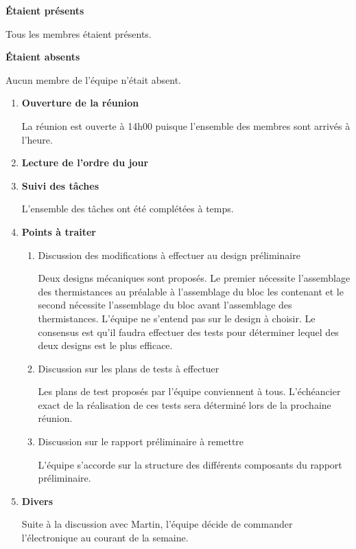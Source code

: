 \documentclass[12pt]{ULojpv}
\begin{document}
\entete

\textbf{Étaient présents}

Tous les membres étaient présents.

\textbf{Étaient absents}

Aucun membre de l'équipe n'était absent.

\begin{enumerate}
   \item \textbf{Ouverture de la réunion}

   La réunion est ouverte à 14h00 puisque l'ensemble des membres sont arrivés à l'heure.
   \item \textbf{Lecture de l'ordre du jour}
   \item \textbf{Suivi des tâches}
   
   L'ensemble des tâches ont été complétées à temps.

   \item \textbf{Points à traiter}
      \begin{enumerate}
         \item Discussion des modifications à effectuer au design préliminaire

         Deux designs mécaniques sont proposés. Le premier nécessite l'assemblage des
         thermistances au préalable à l'assemblage du bloc les contenant et le second 
         nécessite l'assemblage du bloc avant l'assemblage des thermistances. L'équipe 
         ne s'entend pas sur le design à choisir. Le consensus est qu'il faudra effectuer
         des tests pour déterminer lequel des deux designs est le plus efficace.

         \item Discussion sur les plans de tests à effectuer
         
         Les plans de test proposés par l'équipe conviennent à tous. L'échéancier
         exact de la réalisation de ces tests sera déterminé lors de la prochaine
         réunion.

         \item Discussion sur le rapport préliminaire à remettre
         
         L'équipe s'accorde sur la structure des différents composants du rapport préliminaire.

      \end{enumerate}

   \item \textbf{Divers}

      Suite à la discussion avec Martin, l'équipe décide de commander l'électronique au courant de la semaine.
   

\end{enumerate}
\end{document}
